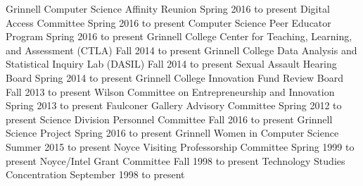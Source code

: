 \begin{cventries}
\end{cventries}


\begin{cventries}


  {Grinnell Computer Science Affinity Reunion}
  {Spring 2016 to present}
  {Digital Access Committee}
  {Spring 2016 to present}
  {Computer Science Peer Educator Program}
  {Spring 2016 to present}
  {Grinnell College Center for Teaching, Learning, and Assessment (CTLA)}
  {Fall 2014 to present}
  {Grinnell College Data Analysis and Statistical Inquiry Lab (DASIL)}
  {Fall 2014 to present}
  {Sexual Assault Hearing Board}
  {Spring 2014 to present}
  {Grinnell College Innovation Fund Review Board}
  {Fall 2013 to present}
  {Wilson Committee on Entrepreneurship and Innovation}
  {Spring 2013 to present}
  {Faulconer Gallery Advisory Committee}
  {Spring 2012 to present}
  {Science Division Personnel Committee}
  {Fall 2016 to present}
  {Grinnell Science Project}
  {Spring 2016 to present}
  {Grinnell Women in Computer Science}
  {Summer 2015 to present}
  {Noyce Visiting Professorship Committee}
  {Spring 1999 to present}
  {Noyce/Intel Grant Committee}
  {Fall 1998 to present}
  {Technology Studies Concentration}
  {September 1998 to present}

\vspace{1mm}



\end{cventries}

